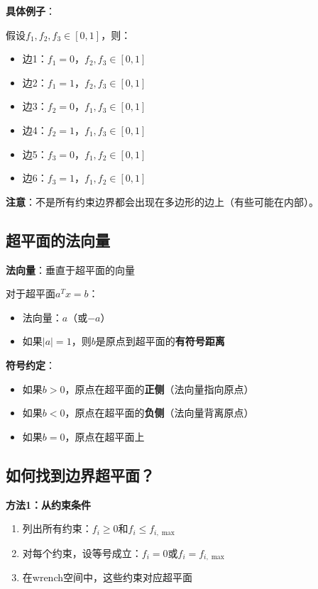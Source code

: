 \documentclass[12pt,a4paper]{article}
\begin{document}
\textbf{具体例子}：

假设$f_1, f_2, f_3 \in [0, 1]$，则：
\begin{itemize}
\item 边1：$f_1 = 0$，$f_2, f_3 \in [0,1]$
\item 边2：$f_1 = 1$，$f_2, f_3 \in [0,1]$
\item 边3：$f_2 = 0$，$f_1, f_3 \in [0,1]$
\item 边4：$f_2 = 1$，$f_1, f_3 \in [0,1]$
\item 边5：$f_3 = 0$，$f_1, f_2 \in [0,1]$
\item 边6：$f_3 = 1$，$f_1, f_2 \in [0,1]$
\end{itemize}

\textbf{注意}：不是所有约束边界都会出现在多边形的边上（有些可能在内部）。

\subsection{超平面的法向量}

\textbf{法向量}：垂直于超平面的向量

对于超平面$a^T x = b$：
\begin{itemize}
\item 法向量：$a$（或$-a$）
\item 如果$|a| = 1$，则$b$是原点到超平面的\textbf{有符号距离}
\end{itemize}

\textbf{符号约定}：
\begin{itemize}
\item 如果$b > 0$，原点在超平面的\textbf{正侧}（法向量指向原点）
\item 如果$b < 0$，原点在超平面的\textbf{负侧}（法向量背离原点）
\item 如果$b = 0$，原点在超平面上
\end{itemize}

\subsection{如何找到边界超平面？}

\textbf{方法1：从约束条件}

\begin{enumerate}
\item 列出所有约束：$f_i \geq 0$和$f_i \leq f_{i,\max}$
\item 对每个约束，设等号成立：$f_i = 0$或$f_i = f_{i,\max}$
\item 在wrench空间中，这些约束对应超平面
\end{enumerate}
\end{document}
